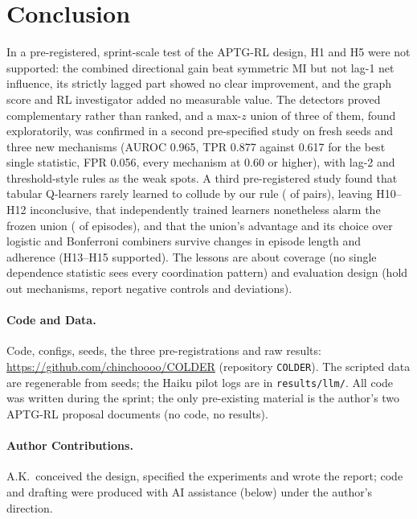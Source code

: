 \documentclass[11pt]{article}
\begin{document}
\section{Conclusion}
In a pre-registered, sprint-scale test of the APTG-RL design, H1 and H5 were not supported: the combined directional gain beat symmetric MI but not lag-1 net influence, its strictly lagged part showed no clear improvement, and the graph score and RL investigator added no measurable value. The detectors proved complementary rather than ranked, and a max-$z$ union of three of them, found exploratorily, was confirmed in a second pre-specified study on fresh seeds and three new mechanisms (AUROC 0.965, TPR 0.877 against 0.617 for the best single statistic, FPR 0.056, every mechanism at 0.60 or higher), with lag-2 and threshold-style rules as the weak spots. A third pre-registered study found that tabular Q-learners rarely learned to collude by our rule (\fPosPairs{} of \fJointPairs{} pairs), leaving H10--H12 inconclusive, that independently trained learners nonetheless alarm the frozen union (\fAlarmIndUthree{} of episodes), and that the union's advantage and its choice over logistic and Bonferroni combiners survive changes in episode length and adherence (H13--H15 supported). The lessons are about coverage (no single dependence statistic sees every coordination pattern) and evaluation design (hold out mechanisms, report negative controls and deviations).




\paragraph{Code and Data.}
Code, configs, seeds, the three pre-registrations and raw results: \url{https://github.com/chinchoooo/COLDER} (repository \texttt{COLDER}). The scripted data are regenerable from seeds; the Haiku pilot logs are in \texttt{results/llm/}. All code was written during the sprint; the only pre-existing material is the author's two APTG-RL proposal documents (no code, no results).
\paragraph{Author Contributions.}
A.K.\ conceived the design, specified the experiments and wrote the report; code and drafting were produced with AI assistance (below) under the author's direction.


\appendix
\end{document}
